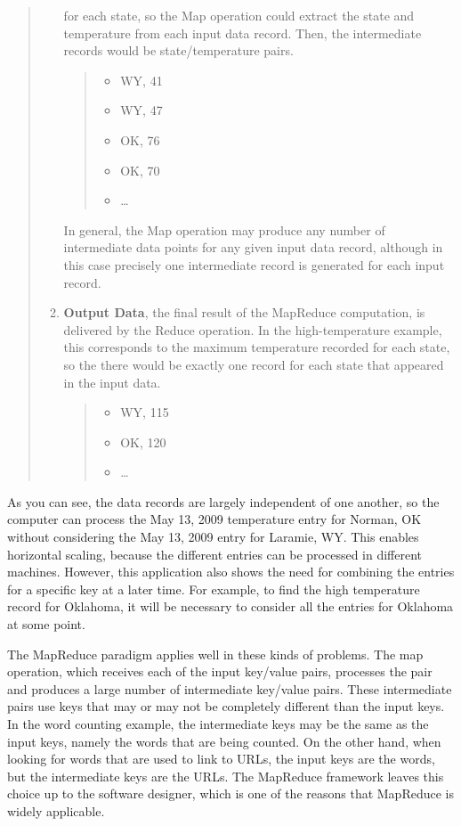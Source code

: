 \begin{quote}
\begin{enumerate}
        for each state, so the Map operation could extract
        the state and temperature from each input data record.
        Then, the intermediate records would be state/temperature pairs.
        \begin {quote}
        \begin{itemize}
            \item \textsf{WY, 41}
            \item \textsf{WY, 47}
            \item \textsf{OK, 76}
            \item \textsf{OK, 70}
            \item \dots
        \end{itemize}
        \end{quote}
        In general, the Map operation may produce any number of intermediate
        data points for any given input data record, although in this case
        precisely one intermediate record is generated for each input record.
    \item \textbf{Output Data}, the final result of the MapReduce computation,
        is delivered by the Reduce operation.
        In the high-temperature example, this
        corresponds to the maximum temperature recorded for each state, so the
        there would be exactly one record for each state that appeared in the input data.
        \begin {quote}
        \begin{itemize}
            \item \textsf{WY, 115}
            \item \textsf{OK, 120}
            \item \dots
        \end{itemize}
        \end{quote}
\end{enumerate}
\end{quote}
As you can see, the data records are largely independent of one another, so the computer
can process the May 13, 2009 temperature entry for Norman, OK without considering the
May 13, 2009 entry for Laramie, WY.  This enables horizontal scaling, because the
different entries can be processed in different machines.
However, this application also shows the need for combining
the entries for a specific key at a later time.  For example,
to find the high temperature record for Oklahoma, it will be
necessary to consider all the entries for Oklahoma at some
point.

The MapReduce paradigm applies well in these kinds of problems.
The \textsf{map} operation, which receives each
of the input key/value pairs, processes the
pair and produces a large number of intermediate
key/value pairs.  These intermediate pairs use keys that may
or may not be completely different than the input keys.
In the word counting example, the intermediate keys may be the same
as the input keys, namely the words that are being counted.
On the other hand, when looking for words that are used to
link to URLs, the input keys are the words, but the
intermediate keys are the URLs. The MapReduce framework leaves
this choice up to the software designer, which is
one of the reasons that MapReduce is widely applicable.

